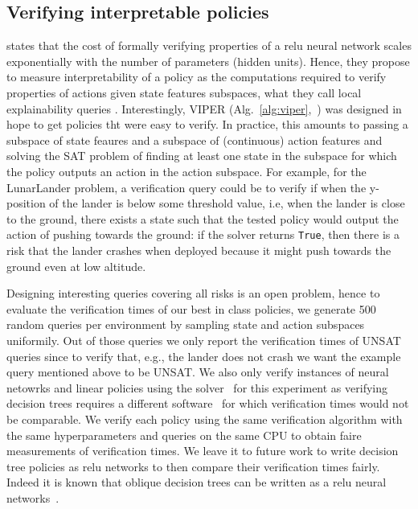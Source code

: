 \subsection{Verifying interpretable policies}
\cite{lens-complexity} states that the cost of formally verifying properties of a relu neural network scales exponentially with the number of parameters (hidden units).
Hence, they propose to measure interpretability of a policy as the computations required to verify properties of actions given state features subspaces, what they call local explainability queries \cite{query}.
Interestingly, VIPER (Alg.~\ref{alg:viper},~\cite{viper}) was designed in hope to get policies tht were easy to verify.
In practice, this amounts to passing a subspace of state feaures and a subspace of (continuous) action features and solving the SAT problem of finding at least one state in the subspace for which the policy outputs an action in the action subspace.
For example, for the LunarLander problem, a verification query could be to verify if when the y-position of the lander is below some threshold value, i.e, when the lander is close to the ground, there exists a state such that the tested policy would output the action of pushing towards the ground: if the solver returns \texttt{True}, then there is a risk that the lander crashes when deployed because it might push towards the ground even at low altitude.

Designing interesting queries covering all risks is an open problem, hence to evaluate the verification times of our best in class policies, we generate 500 random queries per environment by sampling state and action subspaces uniformily.
Out of those queries we only report the verification times of UNSAT queries since to verify that, e.g., the lander does not crash we want the example query mentioned above to be UNSAT.
We also only verify instances of neural netowrks and linear policies using the solver~\cite{maraboupy} for this experiment as verifying decision trees requires a different software~\cite{z3} for which verification times would not be comparable.
We verify each policy using the same verification algorithm with the same hyperparameters and queries on the same CPU to obtain faire measurements of verification times.
We leave it to future work to write decision tree policies as relu networks to then compare their verification times fairly.
Indeed it is known that oblique decision trees can be written as a relu neural networks~\cite{Lee2020Oblique}.

